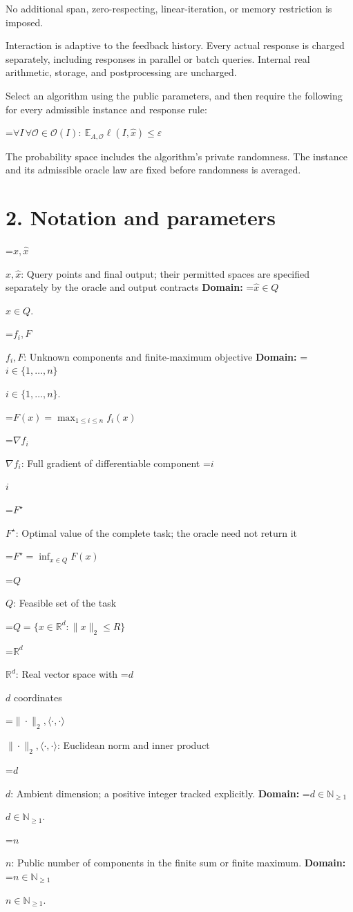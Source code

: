 \documentclass[10pt,a4paper]{article}
\newcommand{\AtlasMath}[1]{\par\begingroup\centering\setbox0=\hbox{$\displaystyle #1$}\ifdim\wd0>1.4\linewidth\typeout{ATLAS WIDE FORMULA: \the\wd0}\fi\ifdim\wd0>\linewidth\resizebox{\linewidth}{!}{\box0}\else\box0\fi\par\endgroup}
\newcommand{\AtlasInlineMath}[1]{\begingroup\setbox0=\hbox{$#1$}\ifdim\wd0>.4\linewidth\endgroup\AtlasMath{#1}\else\endgroup$#1$\fi}
\begin{document}
No additional span, zero-respecting, linear-iteration, or memory restriction is imposed.

Interaction is adaptive to the feedback history. Every actual response is charged separately, including responses in parallel or batch queries. Internal real arithmetic, storage, and postprocessing are uncharged.

Select an algorithm using the public parameters, and then require the following for every admissible instance and response rule:


\AtlasMath{\forall I\,\forall\mathcal{O}\in\mathcal{O}(I):\ \mathbb{E}_{A,\mathcal{O}}\ell(I,\widehat{x})\le\varepsilon}


The probability space includes the algorithm's private randomness. The instance and its admissible oracle law are fixed before randomness is averaged.

\section{2. Notation and parameters}
\AtlasInlineMath{x,\widehat{x}}: Query points and final output; their permitted spaces are specified separately by the oracle and output contracts \textbf{Domain:} \AtlasInlineMath{\widehat{x}\in Q}.

\AtlasInlineMath{f_i,F}: Unknown components and finite-maximum objective \textbf{Domain:} \AtlasInlineMath{i\in\{1,\ldots,n\}}.


\AtlasMath{F(x)=\max_{1\le i\le n}f_i(x)}


\AtlasInlineMath{\nabla f_i}: Full gradient of differentiable component \AtlasInlineMath{i}

\AtlasInlineMath{F^\star}: Optimal value of the complete task; the oracle need not return it


\AtlasMath{F^\star=\inf_{x\in Q}F(x)}


\AtlasInlineMath{Q}: Feasible set of the task


\AtlasMath{Q=\{x\in\mathbb{R}^d:\|x\|_2\le R\}}


\AtlasInlineMath{\mathbb{R}^d}: Real vector space with \AtlasInlineMath{d} coordinates

\AtlasInlineMath{\|\cdot\|_2,\langle\cdot,\cdot\rangle}: Euclidean norm and inner product

\AtlasInlineMath{d}: Ambient dimension; a positive integer tracked explicitly. \textbf{Domain:} \AtlasInlineMath{d\in\mathbb{N}_{\ge1}}.

\AtlasInlineMath{n}: Public number of components in the finite sum or finite maximum. \textbf{Domain:} \AtlasInlineMath{n\in\mathbb{N}_{\ge1}}.
\end{document}
